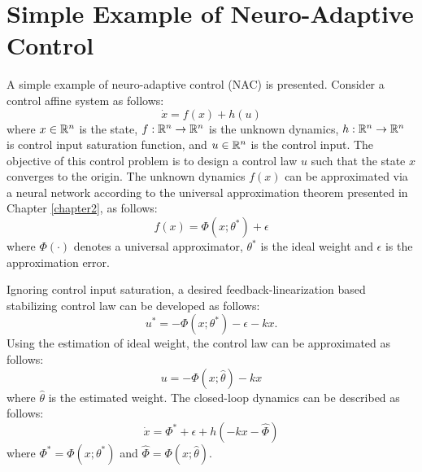 \section{Simple Example of Neuro-Adaptive Control} \label{chap1:sec:example}

A simple example of neuro-adaptive control (NAC) is presented.
Consider a control affine system as follows:
\begin{equation}
    \dot x = f(x) + h(u)
\end{equation}
where $x \in \mathbb{R}^n$ is the state, $f:\mathbb{R}^n\to\mathbb{R}^n$ is the unknown dynamics, $h:\mathbb{R}^n\to\mathbb{R}^n$ is control input saturation function, and $u \in \mathbb{R}^n$ is the control input.
The objective of this control problem is to design a control law $u$ such that the state $x$ converges to the origin.
The unknown dynamics $f(x)$ can be approximated via a neural network according to the universal approximation theorem presented in Chapter \ref{chapter2}, as follows:
\begin{equation}
    f(x) = \Phi(x;\theta^*) + \epsilon
\end{equation}
where $\Phi(\cdot)$ denotes a universal approximator, $\theta^*$ is the ideal weight and $\epsilon$ is the approximation error.

Ignoring control input saturation, a desired feedback-linearization based stabilizing control law can be developed as follows:
\begin{equation}
    u^* = -\Phi(x;\theta^*) - \epsilon - k x
    .
\end{equation}
Using the estimation of ideal weight, the control law can be approximated as follows:
\begin{equation}
    u = -\Phi(x;\hat\theta) - k x
\end{equation}
where $\hat\theta$ is the estimated weight.
The closed-loop dynamics can be described as follows:
\begin{equation}
    \dot x = \Phi^*+\epsilon + h(-kx-\hat\Phi )
\end{equation}
where $\Phi^* = \Phi(x;\theta^*)$ and $\hat\Phi = \Phi(x;\hat\theta)$.

